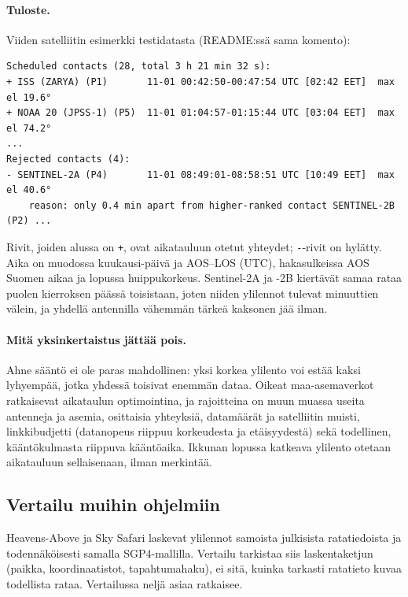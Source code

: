 \documentclass[a4paper,11pt]{article}
\newcommand{\koodi}[1]{\texttt{#1}}
\begin{document}
\paragraph{Tuloste.} Viiden satelliitin esimerkki testidatasta (README:ssä sama komento):
{\small
\begin{verbatim}
Scheduled contacts (28, total 3 h 21 min 32 s):
+ ISS (ZARYA) (P1)       11-01 00:42:50-00:47:54 UTC [02:42 EET]  max el 19.6°
+ NOAA 20 (JPSS-1) (P5)  11-01 01:04:57-01:15:44 UTC [03:04 EET]  max el 74.2°
...
Rejected contacts (4):
- SENTINEL-2A (P4)       11-01 08:49:01-08:58:51 UTC [10:49 EET]  max el 40.6°
    reason: only 0.4 min apart from higher-ranked contact SENTINEL-2B (P2) ...
\end{verbatim}
}
\noindent Rivit, joiden alussa on \koodi{+}, ovat aikatauluun otetut yhteydet; \koodi{-}-rivit
on hylätty. Aika on muodossa kuukausi-päivä ja AOS--LOS (UTC), hakasulkeissa AOS Suomen
aikaa ja lopussa huippukorkeus. Sentinel-2A ja -2B kiertävät samaa rataa puolen kierroksen
päässä toisistaan, joten niiden ylilennot tulevat minuuttien välein, ja yhdellä antennilla
vähemmän tärkeä kaksonen jää ilman.

\paragraph{Mitä yksinkertaistus jättää pois.} Ahne sääntö ei ole paras mahdollinen: yksi
korkea ylilento voi estää kaksi lyhyempää, jotka yhdessä toisivat enemmän dataa. Oikeat
maa-asemaverkot ratkaisevat aikataulun optimointina, ja rajoitteina on muun muassa useita
antenneja ja asemia, osittaisia yhteyksiä, datamäärät ja satelliitin muisti, linkkibudjetti
(datanopeus riippuu korkeudesta ja etäisyydestä) sekä todellinen, kääntökulmasta riippuva
kääntöaika. Ikkunan lopussa katkeava ylilento otetaan aikatauluun sellaisenaan, ilman
merkintää.

\subsection{Vertailu muihin ohjelmiin}\label{sec:vertailu}
Heavens-Above ja Sky Safari laskevat ylilennot samoista julkisista ratatiedoista ja
todennäköisesti samalla SGP4-mallilla. Vertailu tarkistaa siis laskentaketjun (paikka,
koordinaatistot, tapahtumahaku), ei sitä, kuinka tarkasti ratatieto kuvaa todellista rataa.
Vertailussa neljä asiaa ratkaisee.
\end{document}
